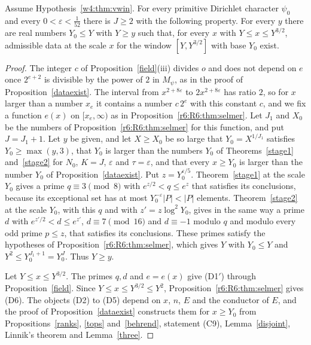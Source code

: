 \begin{proposition}\label{r6:R6:prop:dataexist}
Assume Hypothesis~\ref{w4:thm:vwin}. For every primitive Dirichlet character $\psi_0$ and every $0<\varepsilon<\frac1{52}$ there is $J\ge2$ with the following property. For every $y$ there are real numbers $Y_0\le Y$ with $Y\ge y$ such that, for every $x$ with $Y\le x\le Y^{3/2}$, admissible data at the scale $x$ for the window $[Y,Y^{3/2}]$ with base $Y_0$ exist.
\end{proposition}

\begin{proof}
The integer $c$ of Proposition~\ref{field}(iii) divides $o$ and does not depend on $e$ once $2^{e+2}$ is divisible by the power of $2$ in $M_\psi$, as in the proof of Proposition~\ref{dataexist}. The interval from $x^{2+8\varepsilon}$ to $2x^{2+8\varepsilon}$ has ratio $2$, so for $x$ larger than a number $x_e$ it contains a number $c\,2^e$ with this constant $c$, and we fix a function $e(x)$ on $[x_e,\infty)$ as in Proposition~\ref{r6:R6:thm:selmer}. Let $J_1$ and $X_0$ be the numbers of Proposition~\ref{r6:R6:thm:selmer} for this function, and put $J=J_1+1$. Let $y$ be given, and let $X\ge X_0$ be so large that $Y_0=X^{1/J_1}$ satisfies $Y_0\ge\max(y,3)$, that $Y_0$ is larger than the numbers $Y_0$ of Theorems~\ref{stage1} and~\ref{stage2} for $N_0$, $K=J$, $\varepsilon$ and $\tau=\varepsilon$, and that every $x\ge Y_0$ is larger than the number $Y_0$ of Proposition~\ref{dataexist}. Put $z=Y_0^{\varepsilon/5}$. Theorem~\ref{stage1} at the scale $Y_0$ gives a prime $q\equiv3\pmod8$ with $e^{z/2}<q\le e^z$ that satisfies its conclusions, because its exceptional set has at most $Y_0^{-\varepsilon}\lvert P\rvert<\lvert P\rvert$ elements. Theorem~\ref{stage2} at the scale $Y_0$, with this $q$ and with $z'=z\log^2Y_0$, gives in the same way a prime $d$ with $e^{z'/2}<d\le e^{z'}$, $d\equiv7\pmod{16}$ and $d\equiv-1$ modulo $q$ and modulo every odd prime $p\le z$, that satisfies its conclusions. These primes satisfy the hypotheses of Proposition~\ref{r6:R6:thm:selmer}, which gives $Y$ with $Y_0\le Y$ and $Y^2\le Y_0^{J_1+1}=Y_0^J$. Thus $Y\ge y$.

Let $Y\le x\le Y^{3/2}$. The primes $q,d$ and $e=e(x)$ give (D1$'$) through Proposition~\ref{field}. Since $Y\le x\le Y^{3/2}\le Y^2$, Proposition~\ref{r6:R6:thm:selmer} gives (D6). The objects (D2) to (D5) depend on $x$, $n$, $E$ and the conductor of $E$, and the proof of Proposition~\ref{dataexist} constructs them for $x\ge Y_0$ from Propositions~\ref{ranks}, \ref{tops} and~\ref{behrend}, statement (C9), Lemma~\ref{disjoint}, Linnik's theorem and Lemma~\ref{three}.
\end{proof}

